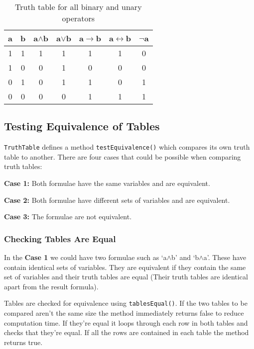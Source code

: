 \documentclass{report}
\begin{document}
\begin{table}[h]
  \begin{center}
    \begin{tabular}{ || c | c || c | c | c | c | c || }
      \hline
      a & b & a$\land$b & a$\lor$b & a$\to$b & a$\leftrightarrow$b & $\lnot$a \\ \hline
      1 & 1 & 1 & 1 & 1 & 1 & 0 \\
      1 & 0 & 0 & 1 & 0 & 0 & 0 \\
      0 & 1 & 0 & 1 & 1 & 0 & 1 \\
      0 & 0 & 0 & 0 & 1 & 1 & 1 \\
      \hline
    \end{tabular}
  \end{center}
  \caption{Truth table for all binary and unary operators}
  \label{table:logical_operators}
\end{table}

\subsection{Testing Equivalence of Tables}
\label{sub:testing_equivalence_of_tables}

{\tt TruthTable} defines a method {\tt testEquivalence()} which compares its own truth table to another. There are four cases that could be possible when comparing truth tables:

\textbf{Case 1: } Both formulae have the same variables and are equivalent.

\textbf{Case 2: } Both formulae have different sets of variables and are equivalent.

\textbf{Case 3: } The formulae are not equivalent.

\subsubsection{Checking Tables Are Equal}

In the \textbf{Case 1} we could have two formulae such as `a$\land$b' and `b$\land$a'. These have contain identical sets of variables. They are equivalent if they contain the same set of variables and their truth tables are equal (Their truth tables are identical apart from the result formula).

Tables are checked for equivalence using {\tt tablesEqual()}. If the two tables to be compared aren't the same size the method immediately returns false to reduce computation time. If they're equal it loops through each row in both tables and checks that they're equal. If all the rows are contained in each table the method returns true.
\end{document}
